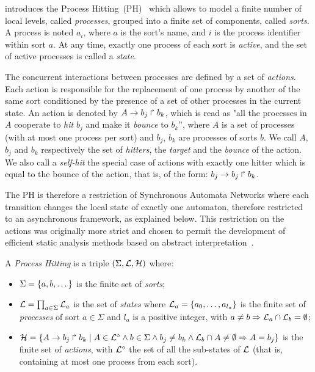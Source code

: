  introduces the Process Hitting~(PH)~\cite{PMR10-TCSB}
which allows to model a finite number of local levels,
called \emph{processes},
grouped into a finite set of components, called \emph{sorts}.
A process is noted $a_i$, where $a$ is the sort's name,
and $i$ is the process identifier within sort $a$.
At any time, exactly one process of each sort is \emph{active},
and the set of active processes is called a \emph{state}.

The concurrent interactions between processes are defined by a set of \emph{actions}.
Each action is responsible for the replacement of one process by another of the same sort
conditioned by the presence of a set of other processes in the current state.
An action is denoted by $A\rightarrow b_j\Rsh b_k$, which is read as "all the processes in $A$ cooperate to \emph{hit} $b_j$ and make it \emph{bounce} to $b_k$'',
where $A$ is a set of processes (with at most one process per sort) and
$b_j$, $b_k$ are processes of sorts $b$.
We call $A$, $b_j$ and $b_k$ respectively the set of \emph{hitters}, the \emph{target} and the \emph{bounce} of the action.
We also call a \emph{self-hit} the special case of actions with exactly one hitter which is equal to the bounce of the action, that is, of the form:
$b_j\rightarrow b_j\Rsh b_k$.

The PH is therefore a restriction of Synchronous Automata Networks where each transition
changes the local state of exactly one automaton,
therefore restricted to an asynchronous framework,
as explained below.
This restriction on the actions was originally more strict and chosen to permit
the development of efficient static analysis methods
based on abstract interpretation~\cite{PMR12-MSCS}.

\begin{definition}\label{def:PH}
  A \emph{Process Hitting} is a triple $(\Sigma,\mathcal{L},\mathcal{H})$ where:
  \begin{itemize}
    \item  $\Sigma = \{a,b,\dots\}$ is the finite set of \emph{sorts};
    \item  $\mathcal{L} = \prod_{a\in\Sigma} \mathcal{L}_a$ is the set of \emph{states} where
      $\mathcal{L}_a = \{a_0,\dots,a_{l_a}\}$
      is the finite set of \emph{processes} of sort $a\in\Sigma$
      and $l_a$ is a positive integer, with $a\neq b\Rightarrow \mathcal{L}_a \cap \mathcal{L}_b = \emptyset$;
    \item $\mathcal{H} = \{ A\rightarrow b_j\Rsh b_k \mid A \in \mathcal{L}^{\diamond} \wedge b \in \Sigma \wedge b_j \neq b_k \wedge \mathcal{L}_b \cap A \neq \emptyset \Rightarrow A=b_j\}$ is the finite set of \emph{actions},
    with $\mathcal{L}^{\diamond}$ the set of all the sub-states of $\mathcal{L}$
    (that is, containing at most one process from each sort).
  \end{itemize}
\end{definition}

